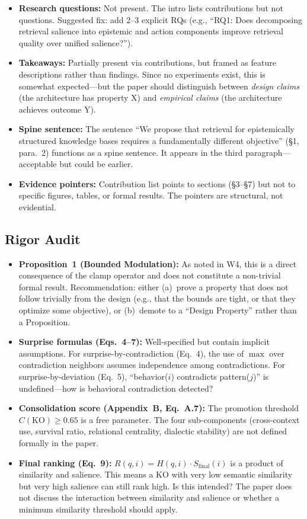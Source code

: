 \documentclass[11pt,a4paper]{article}
\begin{document}
\begin{itemize}[nosep]
\item \textbf{Research questions:} Not present. The intro lists contributions but not questions. Suggested fix: add 2--3 explicit RQs (e.g., ``RQ1: Does decomposing retrieval salience into epistemic and action components improve retrieval quality over unified salience?'').
\item \textbf{Takeaways:} Partially present via contributions, but framed as feature descriptions rather than findings. Since no experiments exist, this is somewhat expected---but the paper should distinguish between \emph{design claims} (the architecture has property X) and \emph{empirical claims} (the architecture achieves outcome Y).
\item \textbf{Spine sentence:} The sentence ``We propose that retrieval for epistemically structured knowledge bases requires a fundamentally different objective'' (\S1, para.~2) functions as a spine sentence. It appears in the third paragraph---acceptable but could be earlier.
\item \textbf{Evidence pointers:} Contribution list points to sections (\S3--\S7) but not to specific figures, tables, or formal results. The pointers are structural, not evidential.
\end{itemize}

\subsection{Rigor Audit}

\begin{itemize}[nosep]
\item \textbf{Proposition~1 (Bounded Modulation):} As noted in W4, this is a direct consequence of the clamp operator and does not constitute a non-trivial formal result. Recommendation: either (a)~prove a property that does not follow trivially from the design (e.g., that the bounds are tight, or that they optimize some objective), or (b)~demote to a ``Design Property'' rather than a Proposition.
\item \textbf{Surprise formulas (Eqs.~4--7):} Well-specified but contain implicit assumptions. For surprise-by-contradiction (Eq.~4), the use of $\max$ over contradiction neighbors assumes independence among contradictions. For surprise-by-deviation (Eq.~5), ``behavior($i$) contradicts pattern($j$)'' is undefined---how is behavioral contradiction detected?
\item \textbf{Consolidation score (Appendix~B, Eq.~A.7):} The promotion threshold $C(\text{KO}) \geq 0.65$ is a free parameter. The four sub-components (cross-context use, survival ratio, relational centrality, dialectic stability) are not defined formally in the paper.
\item \textbf{Final ranking (Eq.~9):} $R(q,i) = H(q,i) \cdot S_{\text{final}}(i)$ is a product of similarity and salience. This means a KO with very low semantic similarity but very high salience can still rank high. Is this intended? The paper does not discuss the interaction between similarity and salience or whether a minimum similarity threshold should apply.
\end{itemize}
\end{document}
